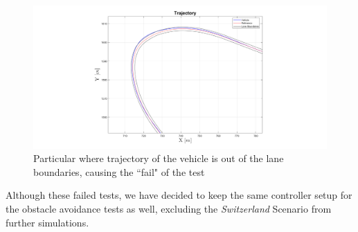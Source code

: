     \begin{figure}[H]
    \centering
    \includegraphics[width=1\textwidth]{Figures/Switz_fail.png}
    \caption{Particular where trajectory of the vehicle is out of the lane boundaries, causing the ``fail" of the test}
      \label{fig:SwitzFail}
\end{figure}


Although these failed tests, we have decided to keep the same controller setup for the obstacle avoidance tests as well, excluding the \textit{Switzerland} Scenario from further simulations.



